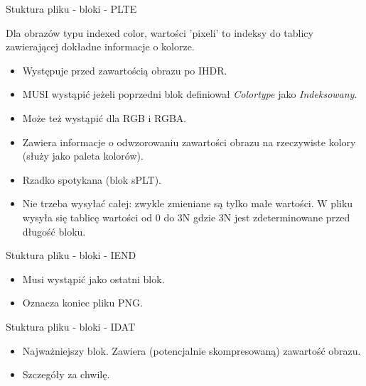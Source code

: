 \documentclass[presentation]{beamer}
\begin{document}
\begin{frame}[label={sec:orgf6191b7}]{Stuktura pliku - bloki - PLTE}
\begin{block}{Dla obrazów typu indexed color, wartości 'pixeli' to indeksy do tablicy zawierającej dokładne informacje o kolorze.}
\begin{itemize}
\item Występuje przed zawartością obrazu po {\color{blue}IHDR}.
\item \alert{MUSI} wystąpić jeżeli poprzedni blok definiował \emph{Colortype} jako \emph{Indeksowany}.
\item Może też wystąpić dla RGB i RGBA.
\item Zawiera informacje o odwzorowaniu zawartości obrazu na rzeczywiste kolory (służy jako paleta kolorów).
\item Rzadko spotykana (blok {\color{blue}sPLT}).
\item Nie trzeba wysyłać całej: zwykle zmieniane są tylko małe
wartości. W pliku wysyła się tablicę wartości od 0 do 3N gdzie 3N
jest zdeterminowane przed długość bloku.
\end{itemize}
\end{block}
\end{frame}

\begin{frame}[label={sec:org8810dee}]{Stuktura pliku - bloki - IEND}
\begin{itemize}
\item Musi wystąpić jako ostatni blok.
\item Oznacza koniec pliku PNG.
\end{itemize}
\end{frame}

\begin{frame}[label={sec:org22e80c8}]{Stuktura pliku - bloki - IDAT}
\begin{itemize}
\item Najważniejszy blok. Zawiera (potencjalnie skompresowaną) zawartość obrazu.
\item Szczegóły za chwilę.
\end{itemize}
\end{frame}
\end{document}
